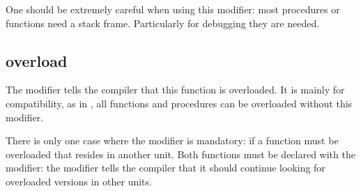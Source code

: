 One should be extremely careful when using this modifier: most procedures or
functions need a stack frame. Particularly for debugging they are needed.

\subsection{overload}
\label{se:overload}
The  modifier tells the compiler that this function is
overloaded. It is mainly for \delphi compatibility, as in \fpc, all
functions and procedures can be overloaded without this modifier.

There is only one case where the  modifier is mandatory:
if a function must be overloaded that resides in another unit. Both
functions must be declared with the  modifier: the
 modifier tells the compiler that it should continue 
looking for overloaded versions in other units.

